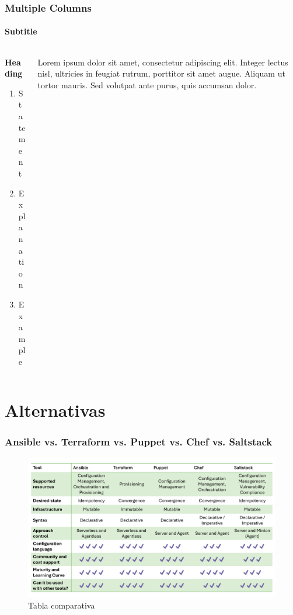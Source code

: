 \documentclass[
	11pt, %
]{beamer}
\begin{document}

\begin{frame}
	\frametitle{Multiple Columns}
	\framesubtitle{Subtitle} %
	
	\begin{columns}[c] %
		\begin{column}{0.45\textwidth} %
			\textbf{Heading}
			\begin{enumerate}
				\item Statement
				\item Explanation
				\item Example
			\end{enumerate}
		\end{column}
		\begin{column}{0.5\textwidth} %
			Lorem ipsum dolor sit amet, consectetur adipiscing elit. Integer lectus nisl, ultricies in feugiat rutrum, porttitor sit amet augue. Aliquam ut tortor mauris. Sed volutpat ante purus, quis accumsan dolor.
		\end{column}
	\end{columns}
\end{frame}

\section{Alternativas}

\begin{frame}
	\frametitle{Ansible vs. Terraform vs. Puppet vs. Chef vs. Saltstack}
	
	\begin{figure}
		\includegraphics[width=0.9\linewidth]{alternativaTabla.pdf}
            \caption{Tabla comparativa \href{https://coralogix.com/blog/the-definitive-guide-to-configuration-management-tools/}{\cite{p5}}}
	\end{figure}

\end{frame}
\end{document}
